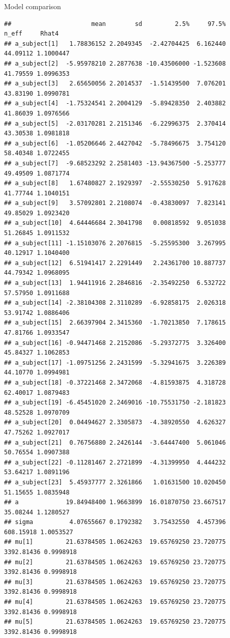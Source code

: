 \documentclass[
  ignorenonframetext,
]{beamer}
\begin{document}
\begin{frame}[fragile]{Model comparison}
\begin{verbatim}
##                      mean        sd         2.5%     97.5%      n_eff     Rhat4
## a_subject[1]   1.78836152 2.2049345  -2.42704425  6.162440   44.09112 1.1000447
## a_subject[2]  -5.95978210 2.2877638 -10.43506000 -1.523608   41.79559 1.0996353
## a_subject[3]   2.65650056 2.2014537  -1.51439500  7.076201   43.83190 1.0990781
## a_subject[4]  -1.75324541 2.2004129  -5.89428350  2.403882   41.86039 1.0976566
## a_subject[5]  -2.03170281 2.2151346  -6.22996375  2.370414   43.30538 1.0981818
## a_subject[6]  -1.05206646 2.4427042  -5.78496675  3.754120   58.40348 1.0722455
## a_subject[7]  -9.68523292 2.2581403 -13.94367500 -5.253777   49.49509 1.0871774
## a_subject[8]   1.67480827 2.1929397  -2.55530250  5.917628   41.77744 1.1040151
## a_subject[9]   3.57092801 2.2108074  -0.43830097  7.823141   49.85029 1.0923420
## a_subject[10]  4.64446684 2.3041798   0.00818592  9.051038   51.26845 1.0911532
## a_subject[11] -1.15103076 2.2076815  -5.25595300  3.267995   40.12917 1.1040400
## a_subject[12]  6.51941417 2.2291449   2.24361700 10.887737   44.79342 1.0968095
## a_subject[13]  1.94411916 2.2846816  -2.35492250  6.532722   57.57950 1.0911688
## a_subject[14] -2.38104308 2.3110289  -6.92858175  2.026318   53.91742 1.0886406
## a_subject[15]  2.66397904 2.3415360  -1.70213850  7.178615   47.81766 1.0933547
## a_subject[16] -0.94471468 2.2152086  -5.29372775  3.326400   45.84327 1.1062853
## a_subject[17] -1.09751256 2.2431599  -5.32941675  3.226389   44.10770 1.0994981
## a_subject[18] -0.37221468 2.3472068  -4.81593875  4.318728   62.40017 1.0879483
## a_subject[19] -6.45451020 2.2469016 -10.75531750 -2.181823   48.52528 1.0970709
## a_subject[20]  0.04494627 2.3305873  -4.38920550  4.626327   47.75262 1.0927017
## a_subject[21]  0.76756880 2.2426144  -3.64447400  5.061046   50.76554 1.0907388
## a_subject[22] -0.11281467 2.2721899  -4.31399950  4.444232   53.64217 1.0891196
## a_subject[23]  5.45937777 2.3261866   1.01631500 10.020450   51.15655 1.0835948
## a             19.84948400 1.9663899  16.01870750 23.667517   35.08244 1.1280527
## sigma          4.07655667 0.1792382   3.75432550  4.457396  608.15918 1.0053527
## mu[1]         21.63784505 1.0624263  19.65769250 23.720775 3392.81436 0.9998918
## mu[2]         21.63784505 1.0624263  19.65769250 23.720775 3392.81436 0.9998918
## mu[3]         21.63784505 1.0624263  19.65769250 23.720775 3392.81436 0.9998918
## mu[4]         21.63784505 1.0624263  19.65769250 23.720775 3392.81436 0.9998918
## mu[5]         21.63784505 1.0624263  19.65769250 23.720775 3392.81436 0.9998918

\end{verbatim}
\end{frame}
\end{document}
